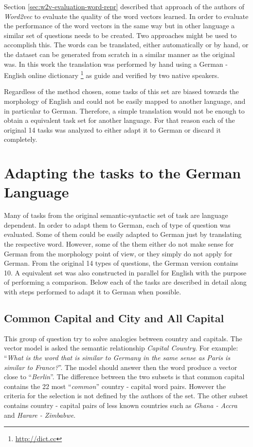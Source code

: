 Section \ref{sec:w2v-evaluation-word-repr} described that approach of the
authors of \textit{Word2vec} to evaluate the quality of the word vectors
learned. In order to evaluate the performance of the word vectors in the same way but in other language a
similar set of questions  needs to be created. Two approaches might be used
to accomplish this. The words can be translated, either automatically or by hand, or the dataset can be
generated from scratch in a similar manner as the original was.  In this work
the translation was performed by hand using a German - English online
dictionary \footnote{\url{http://dict.cc}} as guide and verified by two native speakers.

Regardless of the method chosen, some tasks of this set are biased towards
the morphology of English and could not be easily mapped to another language,
and in particular to German. Therefore, a simple translation would not be
enough to obtain a equivalent task set for another language. For that reason
each of the original 14 tasks was analyzed to either adapt it to German or
discard it completely.  


\section{Adapting the tasks to the German Language}
\label{sec:adapt_task_german_lang}

Many of  tasks from the original  semantic-syntactic set of task are language
dependent. In order to adapt them  to German,  each of type  of question was
evaluated.  Some of them could  be easily adapted to German
just by translating the respective word. However, some of the them either do
not make sense for German from the morphology point of view,  or they simply do not
apply for German. From the original 14 types of questions, the German version 
contains 10. A equivalent set was also constructed in parallel for English with
the purpose of performing a comparison. Below each of the tasks are described
in detail along with steps performed to adapt it to  German when possible.

\subsection{Common Capital and City and All Capital}
\label{sec:sub_sec_common_capital_country}

This group of question try to solve analogies between country and capitals.
The vector model is asked the semantic relationship \emph{Capital Country}.
For example:  ``\emph{What is the word that is similar to
Germany in the same sense as Paris is similar to France?}''. The model should
answer then the word produce a vector close to ``\emph{Berlin}''. The
difference between the two subsets is that common capital contains
 the 22 most ``\textit{common}'' country - capital word pairs. However the
 criteria for the selection is not defined by the authors of the set. The
 other subset contains country - capital pairs of less known countries such
 as \textit{Ghana  -  Accra} and  \textit{Harare -  Zimbabwe}.

